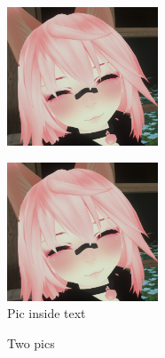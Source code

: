 \documentclass[a4paper]{article}
\begin{document}
	\listoffigures

	\pagebreak
	\blindtext[2]
	\begin{figure}
		\includegraphics[width=45mm]{VRchat_profile.png}
	\end{figure}
	\blindtext[2]

	\pagebreak
	\blindtext[2]
	\begin{figure}
		\includegraphics[width=45mm]{VRchat_profile.png}
		\caption{Pic inside text}
	\end{figure}
	\blindtext[2]
	\pagebreak

	\begin{figure}
		\centering
		\caption{Two pics}
		\label{Fig:Vrfucks}
	\end{figure}
\end{document}
